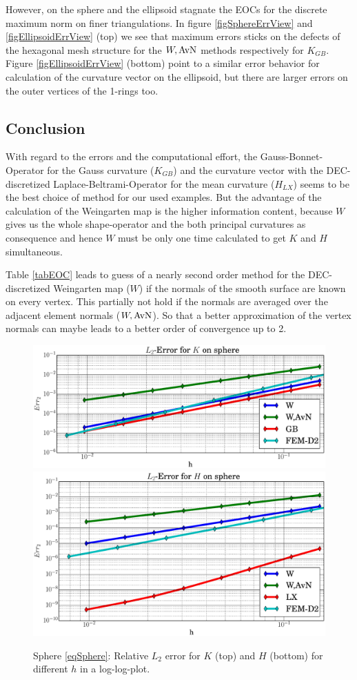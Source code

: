     However, on the sphere and the ellipsoid stagnate the EOCs for the discrete maximum norm on finer triangulations.
    In figure \ref{figSphereErrView} and \ref{figEllipsoidErrView} (top) we see that maximum errors sticks on the defects of the hexagonal
    mesh structure for the \( W,\text{AvN} \) methods respectively for \( K_{GB} \).
    Figure \ref{figEllipsoidErrView} (bottom) point to a similar error behavior for calculation of the curvature vector on the ellipsoid,
    but there are larger errors on the outer vertices of the 1-rings too.

  \subsection{Conclusion}
    With regard to the errors and the computational effort, the Gauss-Bonnet-Operator for the Gauss curvature (\( K_{GB} \)) and the
    curvature vector with the DEC-discretized Laplace-Beltrami-Operator for the mean curvature (\( H_{LX} \)) 
    seems to be the best choice of method for our used
    examples.
    But the advantage of the calculation of the Weingarten map is the higher information content, 
    because \( W \) gives us the whole shape-operator and the both principal curvatures as consequence
    and hence \( W \) must be only one time calculated to get \( K \) and \( H \) simultaneous.

    Table \ref{tabEOC} leads to guess of a nearly second order method for the DEC-discretized Weingarten map (\( W \)) if the normals of the smooth
    surface are known on every vertex.
    This partially not hold if the normals are averaged over the adjacent element normals (\( W,\text{AvN} \)).
    So that a better approximation of the vertex normals can maybe leads to a better order of convergence up to 2.


    


    


  \begin{figure}
    \centering\includegraphics[width=.49\textwidth]{bilder/sphere/L2K.eps}
    \centering\includegraphics[width=.49\textwidth]{bilder/sphere/L2H.eps}
    \caption{Sphere \eqref{eqSphere}: Relative \( L_{2} \) error for \( K \) (top) and
                                                     \( H \) (bottom) for different \( h \) in a log-log-plot.}
    \label{figSphereL2Err}
  \end{figure}

